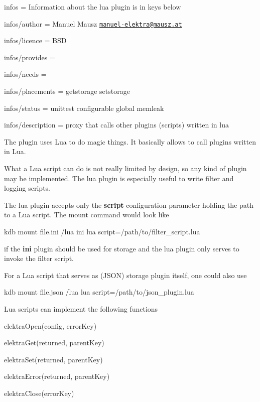 
\begin{DoxyItemize}
\item infos = Information about the lua plugin is in keys below
\item infos/author = Manuel Mausz \href{mailto:manuel-elektra@mausz.at}{\tt manuel-\/elektra@mausz.\+at}
\item infos/licence = B\+SD
\item infos/provides =
\item infos/needs =
\item infos/placements = getstorage setstorage
\item infos/status = unittest configurable global memleak
\item infos/description = proxy that calls other plugins (scripts) written in lua
\end{DoxyItemize}

The plugin uses Lua to do magic things. It basically allows to call plugins written in Lua.

What a Lua script can do is not really limited by design, so any kind of plugin may be implemented. The lua plugin is especially useful to write filter and logging scripts.

The lua plugin accepts only the {\bfseries script} configuration parameter holding the path to a Lua script. The mount command would look like


\begin{DoxyCode}
kdb mount file.ini /lua ini lua script=/path/to/filter\_script.lua
\end{DoxyCode}


if the {\bfseries ini} plugin should be used for storage and the lua plugin only serves to invoke the filter script.

For a Lua script that serves as (J\+S\+ON) storage plugin itself, one could also use


\begin{DoxyCode}
kdb mount file.json /lua lua script=/path/to/json\_plugin.lua
\end{DoxyCode}


Lua scripts can implement the following functions


\begin{DoxyItemize}
\item elektra\+Open(config, error\+Key)
\item elektra\+Get(returned, parent\+Key)
\item elektra\+Set(returned, parent\+Key)
\item elektra\+Error(returned, parent\+Key)
\item elektra\+Close(error\+Key)
\end{DoxyItemize}

